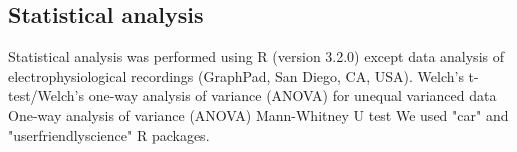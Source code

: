 \subsection*{Statistical analysis}

Statistical analysis was performed using R (version 3.2.0)\cite{R} except data analysis of electrophysiological recordings (GraphPad, San Diego, CA, USA).
Welch's t-test/Welch's one-way analysis of variance (ANOVA) for unequal varianced data
One-way analysis of variance (ANOVA)
Mann-Whitney U test
We used "car"\cite{car} and "userfriendlyscience"\cite{user} R packages. 

    
  
  
  
  
  
  
  
  
  
  
  
  
